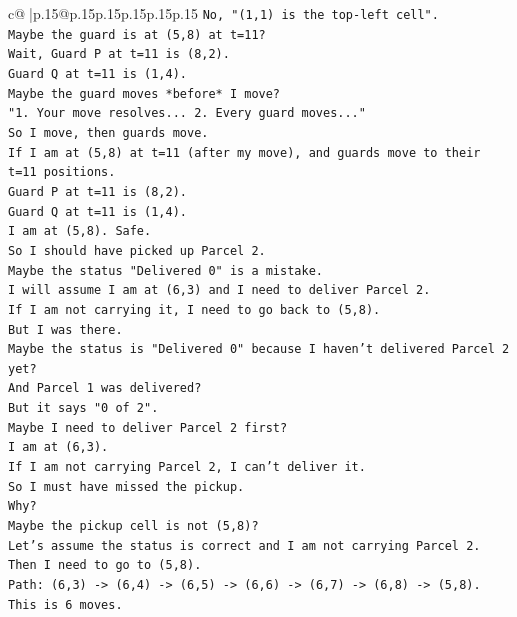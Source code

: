 \documentclass{article}
\begin{document}
{\begin{supertabular}{c@{$\;$}|p{.15\linewidth}@{}p{.15\linewidth}p{.15\linewidth}p{.15\linewidth}p{.15\linewidth}p{.15\linewidth}}
{{{\texttt{No, "(1,1) is the top{-}left cell".} \\
\texttt{Maybe the guard is at (5,8) at t=11?} \\
\texttt{Wait, Guard P at t=11 is (8,2).} \\
\texttt{Guard Q at t=11 is (1,4).} \\
\texttt{Maybe the guard moves *before* I move?} \\
\texttt{"1. Your move resolves... 2. Every guard moves..."} \\
\texttt{So I move, then guards move.} \\
\texttt{If I am at (5,8) at t=11 (after my move), and guards move to their t=11 positions.} \\
\texttt{Guard P at t=11 is (8,2).} \\
\texttt{Guard Q at t=11 is (1,4).} \\
\texttt{I am at (5,8). Safe.} \\
\texttt{So I should have picked up Parcel 2.} \\
\texttt{Maybe the status "Delivered 0" is a mistake.} \\
\texttt{I will assume I am at (6,3) and I need to deliver Parcel 2.} \\
\texttt{If I am not carrying it, I need to go back to (5,8).} \\
\texttt{But I was there.} \\
\texttt{Maybe the status is "Delivered 0" because I haven't delivered Parcel 2 yet?} \\
\texttt{And Parcel 1 was delivered?} \\
\texttt{But it says "0 of 2".} \\
\texttt{Maybe I need to deliver Parcel 2 first?} \\
\texttt{I am at (6,3).} \\
\texttt{If I am not carrying Parcel 2, I can't deliver it.} \\
\texttt{So I must have missed the pickup.} \\
\texttt{Why?} \\
\texttt{Maybe the pickup cell is not (5,8)?} \\
\texttt{Let's assume the status is correct and I am not carrying Parcel 2.} \\
\texttt{Then I need to go to (5,8).} \\
\texttt{Path: (6,3) {-}> (6,4) {-}> (6,5) {-}> (6,6) {-}> (6,7) {-}> (6,8) {-}> (5,8).} \\
\texttt{This is 6 moves.} \\
}}}
\end{supertabular}}
\end{document}
